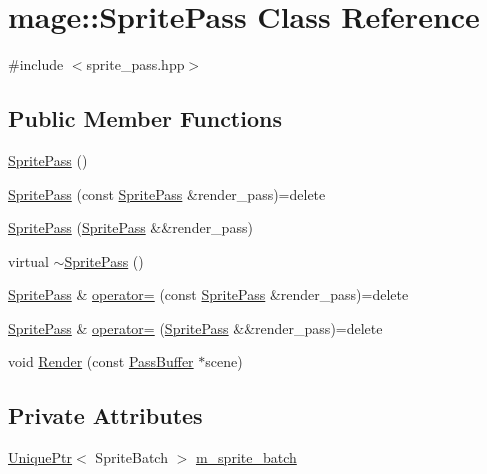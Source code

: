 \hypertarget{classmage_1_1_sprite_pass}{}\section{mage\+:\+:Sprite\+Pass Class Reference}
\label{classmage_1_1_sprite_pass}


{\ttfamily \#include $<$sprite\+\_\+pass.\+hpp$>$}

\subsection*{Public Member Functions}
\begin{DoxyCompactItemize}
\item 
\hyperlink{classmage_1_1_sprite_pass_abe484eb7c99dabc585d874029c85013f}{Sprite\+Pass} ()
\item 
\hyperlink{classmage_1_1_sprite_pass_ac24c782ce252cbbe179aab2277507a87}{Sprite\+Pass} (const \hyperlink{classmage_1_1_sprite_pass}{Sprite\+Pass} \&render\+\_\+pass)=delete
\item 
\hyperlink{classmage_1_1_sprite_pass_a2af9ccc7970eeff94293638d0cd26d16}{Sprite\+Pass} (\hyperlink{classmage_1_1_sprite_pass}{Sprite\+Pass} \&\&render\+\_\+pass)
\item 
virtual \hyperlink{classmage_1_1_sprite_pass_a70a866324750c21196d80364e9a0e309}{$\sim$\+Sprite\+Pass} ()
\item 
\hyperlink{classmage_1_1_sprite_pass}{Sprite\+Pass} \& \hyperlink{classmage_1_1_sprite_pass_afa43bb0a8588e9196180aa686d81cacc}{operator=} (const \hyperlink{classmage_1_1_sprite_pass}{Sprite\+Pass} \&render\+\_\+pass)=delete
\item 
\hyperlink{classmage_1_1_sprite_pass}{Sprite\+Pass} \& \hyperlink{classmage_1_1_sprite_pass_aed8cc2bcb9ded1cb96c9d65bb7034c0a}{operator=} (\hyperlink{classmage_1_1_sprite_pass}{Sprite\+Pass} \&\&render\+\_\+pass)=delete
\item 
void \hyperlink{classmage_1_1_sprite_pass_ad617d46a3edbf5ee533f4d20e3d69ae2}{Render} (const \hyperlink{structmage_1_1_pass_buffer}{Pass\+Buffer} $\ast$scene)
\end{DoxyCompactItemize}
\subsection*{Private Attributes}
\begin{DoxyCompactItemize}
\item 
\hyperlink{namespacemage_a3316d7143a973e37adf1110f2e80ca31}{Unique\+Ptr}$<$ Sprite\+Batch $>$ \hyperlink{classmage_1_1_sprite_pass_a9083152ae0681429df4dd0fce533f7dc}{m\+\_\+sprite\+\_\+batch}
\end{DoxyCompactItemize}


